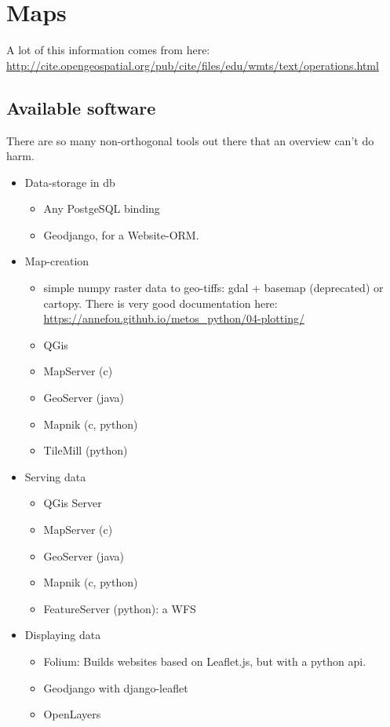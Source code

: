 \section{Maps}

A lot of this information comes from here: \url{http://cite.opengeospatial.org/pub/cite/files/edu/wmts/text/operations.html}

\subsection{Available software} 

There are so many non-orthogonal tools out there that an overview can't do harm.

\begin{itemize}
    \item Data-storage in db
        \begin{itemize}
            \item Any PostgeSQL binding
            \item Geodjango, for a Website-ORM.
        \end{itemize}
    \item Map-creation
        \begin{itemize}
            \item simple numpy raster data to geo-tiffs: gdal + basemap (deprecated) or cartopy. There is very good documentation here: \href{\url{https://annefou.github.io/metos_python/04-plotting/}}{\url{https://annefou.github.io/metos_python/04-plotting/}}
            \item QGis
            \item MapServer (c)
            \item GeoServer (java)
            \item Mapnik (c, python)
            \item TileMill (python)
        \end{itemize}
    \item Serving data
        \begin{itemize}
	    \item QGis Server
            \item MapServer (c)
            \item GeoServer (java)
            \item Mapnik (c, python)
            \item FeatureServer (python): a WFS 
        \end{itemize}
    \item Displaying data
        \begin{itemize}
            \item Folium: Builds websites based on Leaflet.js, but with a python api.
            \item Geodjango with django-leaflet
            \item OpenLayers
        \end{itemize}
\end{itemize}




